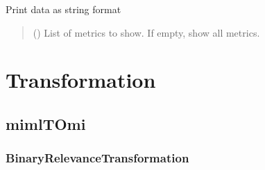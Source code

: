 \documentclass[letterpaper,10pt,english]{sphinxmanual}
\begin{document}
\begin{fulllineitems}

\begin{fulllineitems}
\label{\detokenize{report/_autosummary/miml.report.report.Report:miml.report.report.Report.to_string}}
\pysigstartsignatures
\pysiglinewithargsret
{}
{}
{}
\pysigstopsignatures
\sphinxAtStartPar
Print data as string format
\begin{quote}\begin{description}
\sphinxAtStartPar
{} (\sphinxstyleliteralemphasis{\sphinxupquote{{[}}}\sphinxstyleliteralemphasis{\sphinxupquote{{]}}}\sphinxstyleliteralemphasis{\sphinxupquote{, }}) \textendash{} List of metrics to show. If empty, show all metrics.

\end{description}\end{quote}

\end{fulllineitems}


\end{fulllineitems}


\sphinxstepscope


\chapter{Transformation}
\label{\detokenize{transformation/index:transformation}}\label{\detokenize{transformation/index::doc}}
\sphinxstepscope


\section{mimlTOmi}
\label{\detokenize{transformation/mimlTOmi/index:mimltomi}}\label{\detokenize{transformation/mimlTOmi/index::doc}}
\sphinxstepscope


\subsection{BinaryRelevanceTransformation}
\label{\detokenize{transformation/mimlTOmi/binary_relevance_transformation:binaryrelevancetransformation}}\label{\detokenize{transformation/mimlTOmi/binary_relevance_transformation::doc}}
\end{document}
